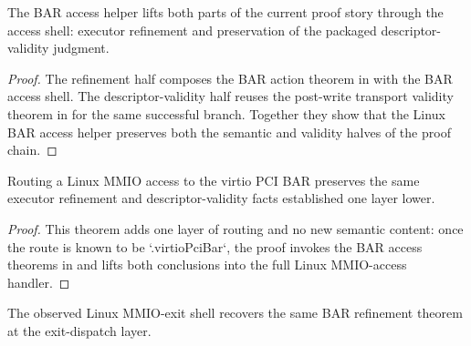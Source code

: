 \begin{theorem}
\label{thm:linux-bar-access}
\leanok
The BAR access helper lifts both parts of the current proof story through the access shell: executor refinement and preservation of the packaged descriptor-validity judgment.
\end{theorem}

\begin{proof}
\leanok
{}
The refinement half composes the BAR action theorem in  with the BAR access shell.
The descriptor-validity half reuses the post-write transport validity theorem in  for the same successful branch.
Together they show that the Linux BAR access helper preserves both the semantic and validity halves of the proof chain.
\end{proof}

\begin{theorem}
\label{thm:linux-mmio-access}
\leanok
Routing a Linux MMIO access to the virtio PCI BAR preserves the same executor refinement and descriptor-validity facts established one layer lower.
\end{theorem}

\begin{proof}
\leanok
{}
This theorem adds one layer of routing and no new semantic content: once the route is known to be `.virtioPciBar`, the proof invokes the BAR access theorems in  and lifts both conclusions into the full Linux MMIO-access handler.
\end{proof}

\begin{theorem}
\label{thm:linux-mmio-exit}
\leanok
The observed Linux MMIO-exit shell recovers the same BAR refinement theorem at the exit-dispatch layer.
\end{theorem}


